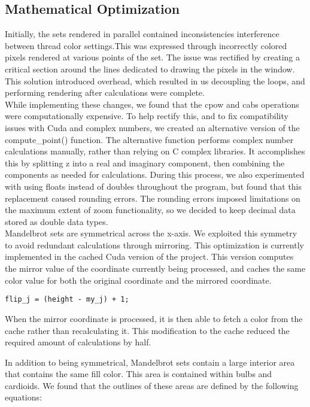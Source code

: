 \documentclass{article}
\begin{document}
\subsection{Mathematical Optimization}

Initially, the sets rendered in parallel contained inconsistencies interference between thread color settings.This was expressed through incorrectly colored pixels rendered at various points of the set.
The issue was rectified by creating a critical section around the lines dedicated to drawing the pixels in the window.
This solution introduced overhead, which resulted in us decoupling the loops, and performing rendering after calculations were complete.\\

While implementing these changes, we found that the cpow and cabs operations were computationally expensive.
To help rectify this, and to fix compatibility issues with Cuda and complex numbers, we created an alternative version of the compute\_point() function.
The alternative function performs complex number calculations manually, rather than relying on C complex libraries.
It accomplishes this by splitting z into a real and imaginary component, then combining the components as needed for calculations.
During this process, we also experimented with using floats instead of doubles throughout the program, but found that this replacement caused rounding errors.
The rounding errors imposed limitations on the maximum extent of zoom functionality, so we decided to keep decimal data stored as double data types.\\

Mandelbrot sets are symmetrical across the x-axis.
We exploited this symmetry to avoid redundant calculations through mirroring.
This optimization is currently implemented in the cached Cuda version of the project.
This version computes the mirror value of the coordinate currently being processed, and caches the same color value for both the original coordinate and the mirrored coordinate.

\begin{verbatim}
flip_j = (height - my_j) + 1;
\end{verbatim}

When the mirror coordinate is processed, it is then able to fetch a color from the cache rather than recalculating it.
This modification to the cache reduced the required amount of calculations by half.

In addition to being symmetrical, Mandelbrot sets contain a large interior area that contains the same fill color.
 This area is contained within bulbs and cardioids.
  We found that the outlines of these areas are defined by the following equations:
\end{document}
